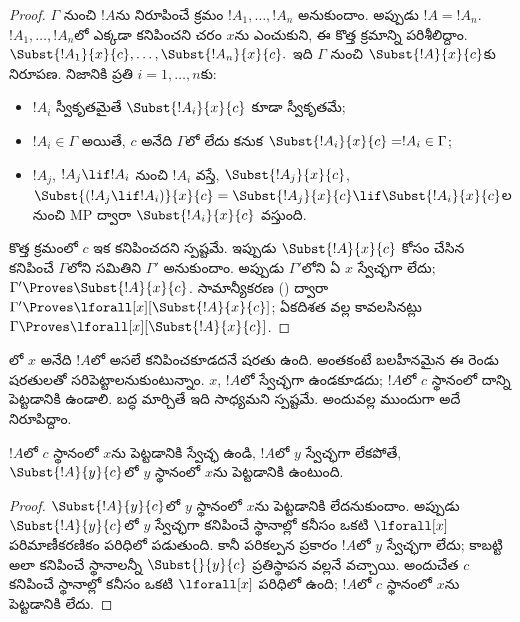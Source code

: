 \documentclass[../../../include/open-logic-section]{subfiles}
\begin{document}
\begin{proof} $\Gamma$ నుంచి $!A$ను నిరూపించే క్రమం $!A_1,\ldots,!A_n$ అనుకుందాం. అప్పుడు $!A=!A_n$. $!A_1,\ldots,!A_n$లో ఎక్కడా కనిపించని చరం $x$ను ఎంచుకుని, ఈ కొత్త క్రమాన్ని పరిశీలిద్దాం. $\Subst{!A_1}{x}{c},\ldots,\Subst{!A_n}{x}{c}.$ ఇది $\Gamma$ నుంచి $\Subst{!A}{x}{c}$కు నిరూపణ. నిజానికి ప్రతి $i=1,\ldots,n$కు: \begin{itemize} \item $!A_i$ స్వీకృతమైతే $\Subst{!A_i}{x}{c}$ కూడా స్వీకృతమే; \item $!A_i \in \Gamma$ అయితే, $c$ అనేది $\Gamma$లో లేదు కనుక $\Subst{!A_i}{x}{c} = !A_i \in \Gamma$; \item $!A_j$, $!A_j \lif !A_i$ నుంచి $!A_i$ వస్తే, $\Subst{!A_j}{x}{c}$, $\Subst{(!A_j \lif !A_i)}{x}{c}
= \Subst{!A_j}{x}{c} \lif \Subst{!A_i}{x}{c}$ల నుంచి MP ద్వారా $\Subst{!A_i}{x}{c}$ వస్తుంది. \end{itemize} కొత్త క్రమంలో  $c$ ఇక కనిపించదని స్పష్టమే. ఇప్పుడు $\Subst{!A}{x}{c}$ కోసం చేసిన  కనిపించే $\Gamma$లోని  సమితిని $\Gamma'$ అనుకుందాం. అప్పుడు $\Gamma'$లోని ఏ  $x$ స్వేచ్ఛగా లేదు; $\Gamma' \Proves \Subst{!A}{x}{c}$. సామాన్యీకరణ () ద్వారా $\Gamma'
\Proves \lforall[x][\Subst{!A}{x}{c}]$; ఏకదిశత వల్ల కావలసినట్లు $\Gamma \Proves
\lforall[x][\Subst{!A}{x}{c}]$.
\end{proof}

\begin{explain}
లో $x$ అనేది $!A$లో అసలే కనిపించకూడదనే షరతు ఉంది. అంతకంటే బలహీనమైన ఈ రెండు షరతులతో సరిపెట్టాలనుకుంటున్నాం. $x$, $!A$లో స్వేచ్ఛగా ఉండకూడదు; $!A$లో $c$ స్థానంలో దాన్ని పెట్టడానికి  ఉండాలి. బద్ధ  మార్చితే ఇది సాధ్యమని స్పష్టమే. అందువల్ల ముందుగా అదే నిరూపిద్దాం.
\end{explain}

\begin{lem}
$!A$లో $c$ స్థానంలో $x$ను పెట్టడానికి స్వేచ్ఛ ఉండి, $!A$లో $y$ స్వేచ్ఛగా లేకపోతే, $\Subst{!A}{y}{c}$లో $y$ స్థానంలో $x$ను పెట్టడానికి  ఉంటుంది.
\end{lem}

\begin{proof} $\Subst{!A}{y}{c}$లో $y$ స్థానంలో $x$ను పెట్టడానికి  లేదనుకుందాం. అప్పుడు $\Subst{!A}{y}{c}$లో $y$ స్వేచ్ఛగా కనిపించే స్థానాల్లో కనీసం ఒకటి $\lforall[x]$ పరిమాణీకరణికం పరిధిలో పడుతుంది. కానీ పరికల్పన ప్రకారం $!A$లో $y$ స్వేచ్ఛగా లేదు; కాబట్టి అలా కనిపించే స్థానాలన్నీ $\Subst{}{y}{c}$ ప్రతిస్థాపన వల్లనే వచ్చాయి. అందుచేత $c$ కనిపించే స్థానాల్లో కనీసం ఒకటి $\lforall[x]$ పరిధిలో ఉంది; $!A$లో $c$ స్థానంలో $x$ను పెట్టడానికి  లేదు.
\end{proof}
\end{document}
